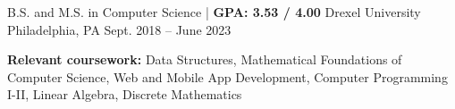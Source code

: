 

\begin{cventries}

  \cventry
  {B.S. and M.S. in Computer Science | \textbf{ GPA: 3.53 / 4.00}} %
  {Drexel University} %
  {Philadelphia, PA} %
  {Sept. 2018 -- June 2023} %
  {
    \begin{cvitems} %
      \item {\color{darktext} \textbf{Relevant coursework:}}
      Data Structures,
      Mathematical Foundations of Computer Science,
      Web and Mobile App Development,
      Computer Programming I-II,
      Linear Algebra,
      Discrete Mathematics
    \end{cvitems}
  }

\end{cventries}
